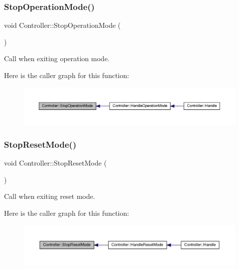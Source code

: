 \subsubsection{\texorpdfstring{Stop\+Operation\+Mode()}{StopOperationMode()}}
{\footnotesize\ttfamily void Controller\+::\+Stop\+Operation\+Mode (\begin{DoxyParamCaption}{ }\end{DoxyParamCaption})\hspace{0.3cm}{\ttfamily [private]}}



Call when exiting operation mode. 

Here is the caller graph for this function\+:
\nopagebreak
\begin{figure}[H]
\begin{center}
\leavevmode
\includegraphics[width=350pt]{classController_ac462515d6845e176608cecf75c696eac_icgraph}
\end{center}
\end{figure}
\mbox{\label{classController_a8088cca43391048e9285d395fbcebc06}} 
\subsubsection{\texorpdfstring{Stop\+Reset\+Mode()}{StopResetMode()}}
{\footnotesize\ttfamily void Controller\+::\+Stop\+Reset\+Mode (\begin{DoxyParamCaption}{ }\end{DoxyParamCaption})\hspace{0.3cm}{\ttfamily [private]}}



Call when exiting reset mode. 

Here is the caller graph for this function\+:
\nopagebreak
\begin{figure}[H]
\begin{center}
\leavevmode
\includegraphics[width=350pt]{classController_a8088cca43391048e9285d395fbcebc06_icgraph}
\end{center}
\end{figure}


